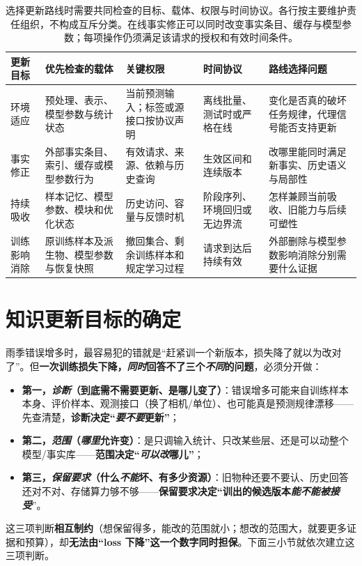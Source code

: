 \begin{table}[htbp]
\small
\begin{tabularx}{\linewidth}{@{}p{23mm}XXXX@{}}
\toprule
更新目标 & 优先检查的载体 & 关键权限 & 时间协议 & 路线选择问题 \\
\midrule
环境适应 & 预处理、表示、模型参数与统计状态 & 当前预测输入；标签或源接口按协议声明 & 离线批量、测试时或严格在线 & 变化是否真的破坏任务规律，代理信号能否支持更新 \\
事实修正 & 外部事实条目、索引、缓存或模型参数行为 & 有效请求、来源、依赖与历史查询 & 生效区间和连续版本 & 改哪里能同时满足新事实、历史语义与局部性 \\
持续吸收 & 样本记忆、模型参数、模块和优化状态 & 历史访问、容量与反馈时机 & 阶段序列、环境回归或无边界流 & 怎样兼顾当前吸收、旧能力与后续可塑性 \\
训练影响消除 & 原训练样本及派生物、模型参数与恢复快照 & 撤回集合、剩余训练样本和规定学习过程 & 请求到达后持续有效 & 外部删除与模型参数影响消除分别需要什么证据 \\
\bottomrule
\end{tabularx}
\caption{选择更新路线时需要共同检查的目标、载体、权限与时间协议。各行按主要维护责任组织，不构成互斥分类。在线事实修正可以同时改变事实条目、缓存与模型参数；每项操作仍须满足该请求的授权和有效时间条件。}
\label{tab:ket-update-route-matrix}
\end{table}

\section{知识更新目标的确定}
\label{sec:ket-update-goals}

雨季错误增多时，最容易犯的错就是“赶紧训一个新版本，损失降了就以为改对了”。但\textbf{一次训练损失下降，\emph{同时}回答不了三个\emph{不同}的问题}，必须分开做：
\begin{itemize}\item \textbf{第一，\emph{诊断}（到底需不需要更新、是哪儿变了）}：错误增多可能来自训练样本本身、评价样本、观测接口（换了相机/单位）、也可能真是预测规律漂移——先查清楚，\textbf{诊断决定“\emph{要不要}更新”}；\item \textbf{第二，\emph{范围}（\emph{哪里}允许变）}：是只调输入统计、只改某些层、还是可以动整个模型/事实库——\textbf{范围决定“\emph{可以改}哪儿”}；\item \textbf{第三，\emph{保留要求}（什么\emph{不能}坏、有多少资源）}：旧物种还要不要认、历史回答还对不对、存储算力够不够——\textbf{保留要求决定“训出的候选版本\emph{能不能被接受}}”。\end{itemize}
这三项判断\textbf{相互制约}（想保留得多，能改的范围就小；想改的范围大，就要更多证据和预算），却\textbf{无法由“loss 下降”这一个数字同时担保}。下面三小节就依次建立这三项判断。

